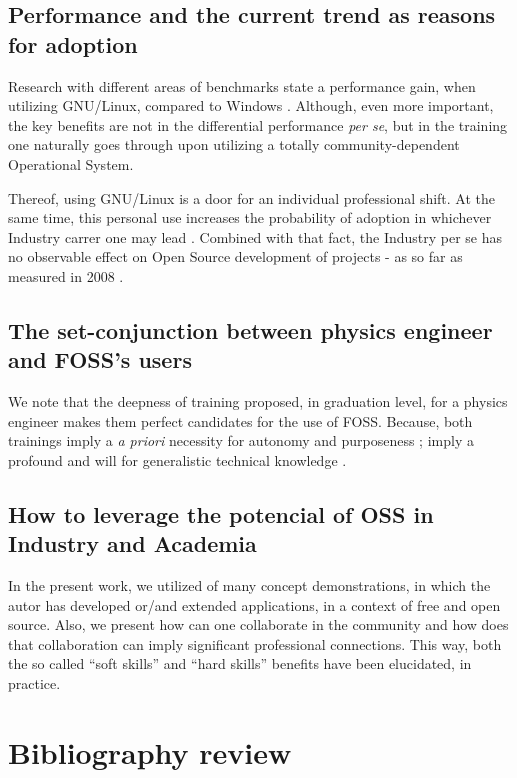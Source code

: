 \documentclass[
12pt,				%
openright,			%
oneside,			%
a4paper,			%
brazil,				%
english,			  %
]{abntex2}
\begin{document}
\section{Performance and the current trend as reasons for adoption}

Research with different areas of benchmarks state a performance gain, when utilizing GNU/Linux, compared to Windows \cite{sulaiman2021comparison}. Although, even more important, the key benefits are not in the differential performance \textit{per se}, but in the training one naturally goes through upon utilizing a totally community-dependent Operational System. 

Thereof, using GNU/Linux is a door for an individual professional shift. At the same time, this personal use increases the probability of adoption in whichever Industry carrer one may lead \cite{hauge2008adoption}. Combined with that fact, the Industry per se has no observable effect on Open Source development of projects - as so far as measured in 2008 \cite{hauge2008adoption}.

\section{The set-conjunction between physics engineer and FOSS's users}

We note that the deepness of training proposed, in graduation level, for a physics engineer makes them perfect candidates for the use of FOSS. Because, both trainings imply a \textit{a priori} necessity for autonomy and purposeness \cite{schrape2019open,racero2020predicting}; imply a profound and will for generalistic technical knowledge \cite{li2013all,gallego2015open}.

\section{How to leverage the potencial of OSS in Industry and Academia}

In the present work, we utilized of many concept demonstrations, in
which the autor has developed or/and extended applications, in a
context of free and open source. Also, we present how can one
collaborate in the community and how does that collaboration can imply
significant professional connections. This way, both the so called
``soft skills'' and ``hard skills'' benefits have been elucidated, in practice.  

\chapter{Bibliography review}
\end{document}
